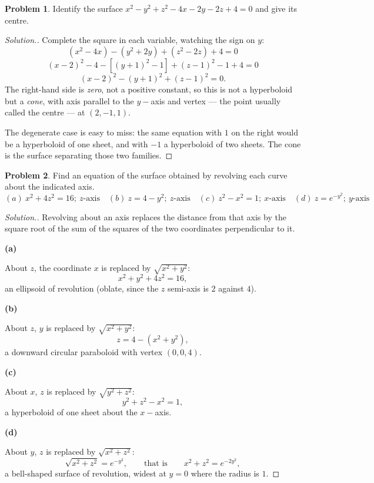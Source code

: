 \documentclass[11pt,a4paper]{article}
\theoremstyle{definition}
\newtheorem{problemx}{Problem}[subsection]
\newenvironment{problem}{\begin{problemx}}{\end{problemx}}
\newenvironment{solution}
  {\renewcommand{\qedsymbol}{}\begin{proof}[\textit{Solution}.]}
  {\end{proof}}
\newcommand{\subhead}[1]{%
  \par\medskip\noindent\textbf{#1}\par\nobreak\smallskip}
\begin{document}
\begin{problem}
Identify the surface $x^2-y^2+z^2-4x-2y-2z+4 = 0$ and give its centre.
\end{problem}
\begin{solution}
Complete the square in each variable, watching the sign on $y$:
\[(x^2-4x) - (y^2+2y) + (z^2-2z) + 4 = 0\]
\[(x-2)^2-4 - [(y+1)^2-1] + (z-1)^2-1 + 4 = 0\]
\[(x-2)^2 - (y+1)^2 + (z-1)^2 = 0 .\]
The right-hand side is \emph{zero}, not a positive constant, so this is not a
hyperboloid but a \emph{cone}, with axis parallel to the $y-$axis and vertex ---
the point usually called the centre --- at $(2,-1,1)$.

The degenerate case is easy to miss: the same equation with $1$ on the right
would be a hyperboloid of one sheet, and with $-1$ a hyperboloid of two sheets.
The cone is the surface separating those two families.
\end{solution}

\begin{problem}
Find an equation of the surface obtained by revolving each curve about the
indicated axis.
\[(a)\ x^2+4z^2 = 16;\ z\text{-axis}\quad 
(b)\ z = 4-y^2;\ z\text{-axis}\quad 
(c)\ z^2-x^2 = 1;\ x\text{-axis}\quad 
(d)\ z = e^{-y^2};\ y\text{-axis}\]
\end{problem}
\begin{solution}
Revolving about an axis replaces the distance from that axis by
the square root of the sum of the squares of the two coordinates perpendicular to it.

\subhead{(a)} About $z$, the coordinate $x$ is replaced by
$\sqrt{x^2+y^2}$:
\[x^2+y^2+4z^2 = 16 ,\]
an ellipsoid of revolution (oblate, since the $z$ semi-axis is $2$ against $4$).

\subhead{(b)} About $z$, $y$ is replaced by $\sqrt{x^2+y^2}$:
\[z = 4-(x^2+y^2),\]
a downward circular paraboloid with vertex $(0,0,4)$.

\subhead{(c)} About $x$, $z$ is replaced by $\sqrt{y^2+z^2}$:
\[y^2+z^2-x^2 = 1 ,\]
a hyperboloid of one sheet about the $x-$axis.

\subhead{(d)} About $y$, $z$ is replaced by $\sqrt{x^2+z^2}$:
\[\sqrt{x^2+z^2} = e^{-y^2},\qquad\text{that is}\qquad
x^2+z^2 = e^{-2y^2},\]
a bell-shaped surface of revolution, widest at $y=0$ where the radius is $1$.
\end{solution}
\end{document}
